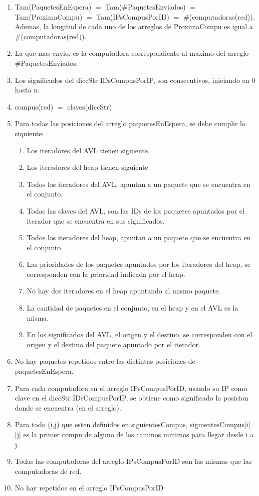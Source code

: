 \begin{Representacion}
    \begin{enumerate} 
      \item Tam(PaquetesEnEspera) $=$ Tam($\#$PaquetesEnviados) $=$ Tam(ProximaCompu) $=$ Tam(IPsCompusPorID) $=$ $\#$(computadoras(red)). Ademas, la longitud de cada uno de los arreglos de ProximaCompu es igual a \#(computadoras(red)).
      \item La que mas envio, es la computadora correspondiente al maximo del arreglo \#PaquetesEnviados.
      \item Los significados del diccStr IDsCompusPorIP, son consecutivos, iniciando en 0 hasta n.
      \item compus(red) $=$ claves(diccStr)
      \item Para todas las posiciones del arreglo paquetesEnEspera, se debe cumplir lo siquiente:
              \begin{enumerate} 
              \item Los iteradores del AVL tienen siguiente.
              \item Los iteradores del heap tienen siguiente
              \item Todos los iteradores del AVL, apuntan a un paquete que se encuentra en el conjunto.
              \item Todas las claves del AVL, son las IDs de los paquetes apuntados por el iterador que se encuentra en sus significados.
              \item Todos los iteradores del heap, apuntan a un paquete que se encuentra en el conjunto.
              \item Las prioridades de los paquetes apuntados por los iteradores del heap, se corresponden con la prioridad indicada por el heap.
              \item No hay dos iteradores en el heap apuntando al mismo paquete.
              \item La cantidad de paquetes en el conjunto, en el heap y en el AVL es la misma.
              \item En los significados del AVL, el origen y el destino, se corresponden con el origen y el destino del paquete apuntado por el iterador.
              \end{enumerate}
      \item No hay paquetes repetidos entre las distintas posiciones de paquetesEnEspera.
      \item Para cada computadora en el arreglo IPsCompusPorID, usando su IP como clave en el diccStr IDsCompusPorIP, se obtiene como significado la posicion donde se encuentra (en el arreglo).
      \item Para todo (i,j) que esten definidos en siguientesCompus, siguientesCompus[i][j] es la primer compu de alguno de los caminos minimos para llegar desde i a j.
      \item Todas las computadoras del arreglo IPsCompusPorID son las mismas que las computadoras de red.
      \item No hay repetidos en el arreglo IPsCompusPorID



\end{enumerate}
\end{Representacion}
